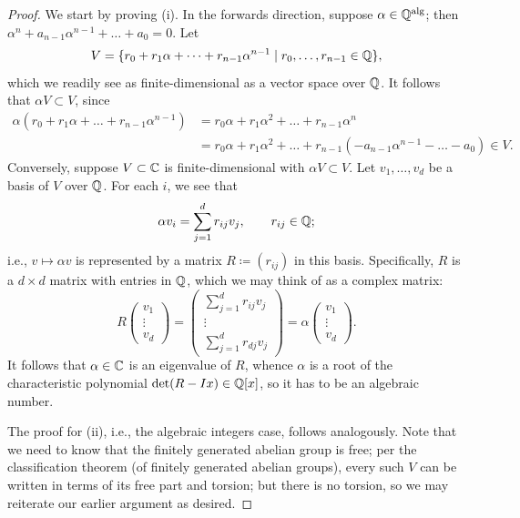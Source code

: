 \begin{proof}
    We start by proving (i). In the forwards direction, suppose $\alpha \in \mathbb Q^{\operatorname{alg}}$; then $\alpha^n + a_{n-1} \alpha^{n-1} + \dots + a_0 = 0$. Let
    \[ V = \{r_0 + r_1\alpha + \dots + r_{n-1}\alpha^{n-1} \mid r_0, \dots, r_{n-1} \in \mathbb Q\}, \]
    which we readily see as finite-dimensional as a vector space over $\mathbb Q$. It follows that $\alpha V \subset V$, since
    \begin{align*}
        \alpha(r_0 + r_1 \alpha + \dots + r_{n-1}\alpha^{n-1}) &= r_0 \alpha + r_1 \alpha^2 + \dots + r_{n-1} \alpha^n \\
        &= r_0\alpha + r_1\alpha^2 + \dots + r_{n-1}(-a_{n-1}\alpha^{n-1} - \dots - a_0) \in V.
    \end{align*}
    Conversely, suppose $V \subset \mathbb C$ is finite-dimensional with $\alpha V \subset V$. Let $v_1, \dots, v_d$ be a basis of $V$ over $\mathbb Q$. For each $i$, we see that
    \[ \alpha v_i = \sum_{j=1}^d r_{ij} v_j, \qquad r_{ij} \in \mathbb Q; \]
    i.e., $v \mapsto \alpha v$ is represented by a matrix $R \coloneq (r_{ij})$ in this basis. Specifically, $R$ is a $d \times d$ matrix with entries in $\mathbb Q$, which we may think of as a complex matrix:
    \[ R \begin{pmatrix} v_1 \\ \vdots \\ v_d \end{pmatrix} = \begin{pmatrix} \sum_{j=1}^d r_{ij} v_j \\ \vdots \\ \sum_{j=1}^d r_{dj} v_j \end{pmatrix} = \alpha \begin{pmatrix} v_1 \\ \vdots \\ v_d \end{pmatrix}. \]
    It follows that $\alpha \in \mathbb C$ is an eigenvalue of $R$, whence $\alpha$ is a root of the characteristic polynomial $\det (R - I x) \in \mathbb Q[x]$, so it has to be an algebraic number.

    The proof for (ii), i.e., the algebraic integers case, follows analogously. Note that we need to know that the finitely generated abelian group is free; per the classification theorem (of finitely generated abelian groups), every such $V$ can be written in terms of its free part and torsion; but there is no torsion, so we may reiterate our earlier argument as desired.
\end{proof}

